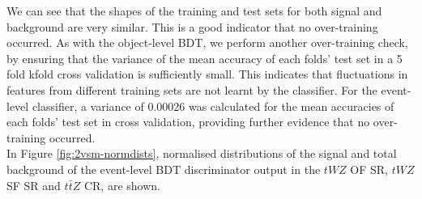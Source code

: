 We can see that the shapes of the training and test sets for both signal and background are very similar. This is a good indicator that no over-training occurred. As with the object-level BDT, we perform another over-training check, by ensuring that the variance of the mean accuracy of each folds' test set in a 5 fold kfold cross validation is sufficiently small. This indicates that fluctuations in features from different training sets are not learnt by the classifier. For the event-level classifier, a variance of 0.00026 was calculated for the mean accuracies of each folds' test set in cross validation, providing further evidence that no over-training occurred.\\
In Figure \ref{fig:2vsm-normdists}, normalised distributions of the signal and total background of the event-level BDT discriminator output in the $tWZ$ OF SR, $tWZ$ SF SR and $t\bar{t}Z$ CR, are shown. 

